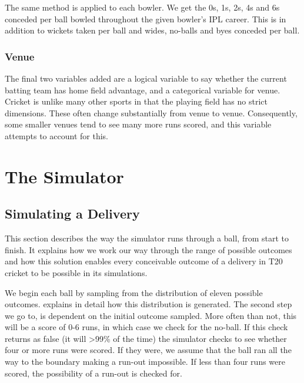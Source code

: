 The same method is applied to each bowler. We get the 0s, 1s, 2s, 4s and 6s conceded per ball bowled throughout the given bowler’s IPL career. This is in addition to wickets taken per ball and wides, no-balls and byes conceded per ball. 

\subsubsection{Venue}

The final two variables added are a logical variable to say whether the current batting team has home field advantage, and a categorical variable for venue. Cricket is unlike many other sports in that the playing field has no strict dimensions. These often change substantially from venue to venue. Consequently, some smaller venues tend to see many more runs scored, and this variable attempts to account for this.

\section{The Simulator}
\label{sec: sim}

\subsection{Simulating a Delivery}

This section describes the way the simulator runs through a ball, from start to finish. It explains how we work our way through the range of possible outcomes and how this solution enables every conceivable outcome of a delivery in T20 cricket to be possible in its simulations.\footnotemark{}


We begin each ball by sampling from the distribution of eleven possible outcomes.  explains in detail how this distribution is generated. The second step we go to, is dependent on the initial outcome sampled. More often than not, this will be a score of 0-6 runs, in which case we check for the no-ball. If this check returns as false (it will >99\% of the time) the simulator checks to see whether four or more runs were scored. If they were, we assume that the ball ran all the way to the boundary making a run-out impossible. If less than four runs were scored, the possibility of a run-out is checked for.

